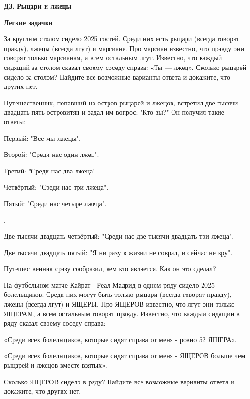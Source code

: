 \centerline{\bf \Huge ДЗ. Рыцари и лжецы}
\centerline{\bf \Huge }

\begin{flushright}
        \scriptsize{\textbf{Легкие задачки}}
\end{flushright}

 За круглым столом сидело 2025 гостей. Среди них есть рыцари
(всегда говорят правду), лжецы (всегда лгут) и марсиане. Про марсиан известно, что правду они
говорят только марсианам, а всем остальным лгут. Известно, что каждый сидящий за столом
сказал своему соседу справа: «Ты — лжец». Сколько рыцарей сидело за столом? Найдите все
возможные варианты ответа и докажите, что других нет.

Путешественник, попавший на остров рыцарей и лжецов, встретил две тысячи двадцать пять островитян и задал им вопрос: "Кто вы?" Он получил такие ответы:


Первый: "Все мы лжецы".

Второй: "Среди нас один лжец".

Третий: "Среди нас два лжеца".


Четвёртый: "Среди нас три лжеца".

Пятый: "Среди нас четыре лжеца".


.


Две тысячи двадцать четвёртый: "Среди нас две тысячи двадцать три лжеца".


Две тысячи двадцать пятый: "Я ни разу в жизни не соврал, и сейчас не вру".


Путешественник сразу сообразил, кем кто является. Как он это сделал?

 На футбольном матче Кайрат - Реал Мадрид в одном ряду сидело 2025 болельщиков. Среди них могут быть только рыцари
(всегда говорят правду), лжецы (всегда лгут) и ЯЩЕРЫ. Про ЯЩЕРОВ известно, что лгут они
только ЯЩЕРАМ, а всем остальным говорят правду. Известно, что каждый сидящий в ряду
сказал своему соседу справа:

 «Среди всех болельщиков, которые сидят справа от меня - ровно 52 ЯЩЕРА». 

 «Среди всех болельщиков, которые сидят справа от меня - ЯЩЕРОВ больше чем рыцарей и лжецов вместе взятых».

Сколько ЯЩЕРОВ сидело в ряду? Найдите все
возможные варианты ответа и докажите, что других нет.